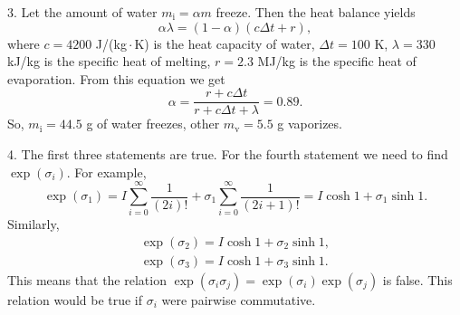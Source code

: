 \documentclass[12pt,a4paper,pdflatex]{disser}
\begin{document}
3. Let the amount of water $m_\text{i}=\alpha m$ freeze. Then the heat balance yields
$$
  \alpha \lambda=(1-\alpha)(c\Delta t+r),
$$
where $c=4200$ J/(kg\,$\cdot$\,K) is the heat capacity of water, $\Delta t=100$ K, $\lambda=330$ kJ/kg is the specific heat of melting, $r=2.3$ MJ/kg is the specific heat of evaporation. From this equation we get
$$
  \alpha=\frac{r+c\Delta t}{r+c\Delta t+\lambda}=0.89.
$$
So, $m_\text{i}=44.5$ g of water freezes, other $m_\text{v}=5.5$ g vaporizes.

4. The first three statements are true. For the fourth statement we need to find $\exp(\sigma_i)$. For example,
$$
  \exp(\sigma_1)=I\sum\limits_{i=0}^\infty \frac{1}{(2i)!}+\sigma_1 \sum\limits_{i=0}^\infty \frac{1}{(2i+1)!}=I\cosh 1+\sigma_1 \sinh 1.
$$
Similarly,
\begin{gather*}
  \exp(\sigma_2)=I\cosh 1+\sigma_2 \sinh 1,\\
  \exp(\sigma_3)=I\cosh 1+\sigma_3 \sinh 1.
\end{gather*}
This means that the relation $\exp(\sigma_i \sigma_j)=\exp(\sigma_i)\exp(\sigma_j)$ is false. This relation would be true if $\sigma_i$ were pairwise commutative.
\end{document}
